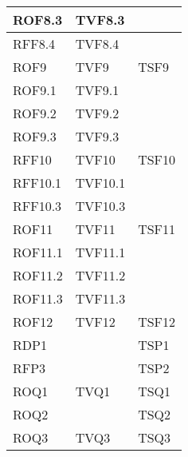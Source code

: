 \begin{center}
\begin{longtable}{| p{4cm} | p{4cm} | p{4cm} |}
	\hline
	\hspace{2 mm} ROF8.3  & TVF8.3 &  \\
	\hline
	\hspace{2 mm} RFF8.4  & TVF8.4 &  \\
	\hline
	ROF9  & TVF9 & TSF9 \\
	\hline
	\hspace{2 mm} ROF9.1  & TVF9.1 &  \\
	\hline
	\hspace{2 mm} ROF9.2  & TVF9.2 &  \\
	\hline
	\hspace{2 mm} ROF9.3  & TVF9.3 &  \\
	\hline
	RFF10  & TVF10 & TSF10 \\
	\hline
	\hspace{2 mm} RFF10.1  & TVF10.1 &  \\
	\hline
	\hspace{2 mm} RFF10.3  & TVF10.3 &  \\
	\hline
	ROF11  & TVF11 & TSF11 \\
	\hline
	\hspace{2 mm} ROF11.1  & TVF11.1 &  \\
	\hline
	\hspace{2 mm} ROF11.2  & TVF11.2 &  \\
	\hline
	\hspace{2 mm} ROF11.3  & TVF11.3 &  \\
	\hline
	ROF12  & TVF12 & TSF12 \\
	\hline

	
	RDP1  &  & TSP1 \\
	\hline
	RFP3  &  & TSP2 \\
	\hline
	
	
	ROQ1  & TVQ1 & TSQ1 \\
	\hline
	ROQ2  &  & TSQ2 \\
	\hline
	ROQ3  & TVQ3 & TSQ3 \\
	\hline
	
	

\end{longtable}
\end{center}
